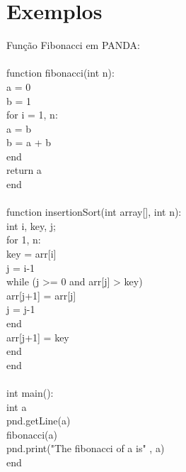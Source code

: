\documentclass[letterpaper,12pt]{article}
\begin{document}
\section{Exemplos}
Fun\c{c}\~ao Fibonacci em PANDA:\\
\\
function fibonacci(int n):\\
\hspace*{8mm}a = 0\\
\hspace*{8mm}b = 1\\
\hspace*{8mm}for i = 1, n:\\
\hspace*{12mm}a = b\\
\hspace*{12mm}b = a + b\\
\hspace*{8mm}end\\
\hspace*{8mm}return a\\
end\\
\\
function insertionSort(int array[], int n):\\
\hspace*{8mm}int i, key, j;\\
\hspace*{8mm}for 1, n:\\
\hspace*{12mm}key = arr[i]\\
\hspace*{12mm}j = i-1\\
\hspace*{12mm}while (j >= 0 and arr[j] > key)\\
\hspace*{16mm}arr[j+1] = arr[j]\\
\hspace*{16mm}j = j-1\\
\hspace*{12mm}end\\
\hspace*{12mm}arr[j+1] = key\\
\hspace*{8mm}end\\
end\\
\\
int main():\\
\hspace*{8mm}int a\\
\hspace*{8mm}pnd.getLine(a)\\
\hspace*{8mm}fibonacci(a)\\
\hspace*{8mm}pnd.print("The fibonacci of a is" , a)\\
end\\
\end{document}
